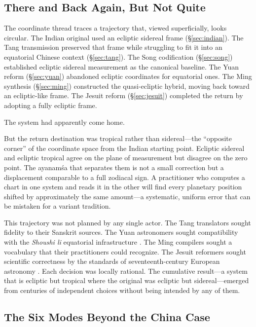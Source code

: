 \documentclass[10pt,a4paper]{article}
\begin{document}
\subsection*{There and Back Again, But Not Quite}

The coordinate thread traces a trajectory that, viewed superficially, looks
circular.  The Indian original used an ecliptic sidereal frame
(\S\ref{sec:indian}).  The Tang transmission preserved that frame while
struggling to fit it into an equatorial Chinese context
(\S\ref{sec:tang}).  The Song codification (\S\ref{sec:song}) established
ecliptic sidereal measurement as the canonical baseline.  The Yuan reform
(\S\ref{sec:yuan}) abandoned ecliptic coordinates for equatorial ones.  The
Ming synthesis (\S\ref{sec:ming}) constructed the quasi-ecliptic hybrid, moving
back toward an ecliptic-like frame.  The Jesuit reform (\S\ref{sec:jesuit})
completed the return by adopting a fully ecliptic frame.

The system had apparently come home.

But the return destination was tropical rather than sidereal---the ``opposite
corner'' of the coordinate space from the Indian starting point.  Ecliptic
sidereal and ecliptic tropical agree on the plane of measurement but disagree
on the zero point.  The ayanam\'{s}a that separates them is not a small
correction but a displacement comparable to a full zodiacal sign.  A
practitioner who computes a chart in one system and reads it in the other will
find every planetary position shifted by approximately the same amount---a
systematic, uniform error that can be mistaken for a variant tradition.

This trajectory was not planned by any single actor.  The Tang translators
sought fidelity to their Sanskrit sources.  The Yuan astronomers sought
compatibility with the \textit{Shoushi li} equatorial infrastructure
\cite{sivin2009granting}.  The Ming compilers sought a vocabulary that their
practitioners could recognize.  The Jesuit reformers sought scientific
correctness by the standards of seventeenth-century European astronomy
\cite{liu2020missionary}.  Each decision was locally rational.  The cumulative
result---a system that is ecliptic but tropical where the original was ecliptic
but sidereal---emerged from centuries of independent choices without being
intended by any of them.

\subsection*{The Six Modes Beyond the China Case}
\end{document}
